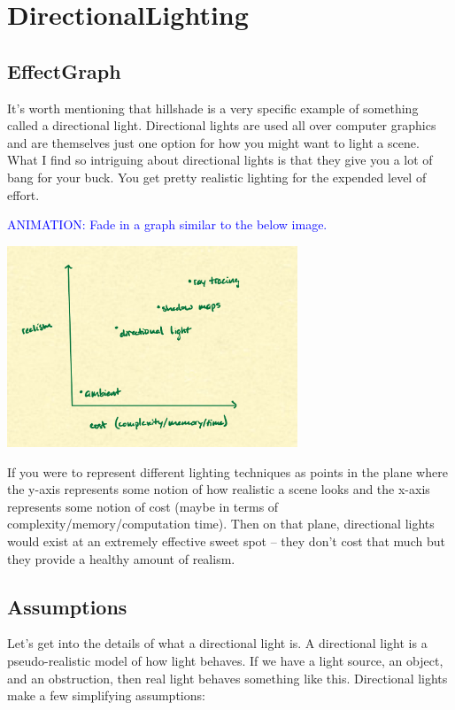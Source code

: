 \documentclass{article}
\newcommand\animation[1]{\textcolor{blue}{ANIMATION: #1}}
\begin{document}
\section{DirectionalLighting}

\subsection{EffectGraph}

It's worth mentioning that hillshade is a very specific example of something called a directional light.
Directional lights are used all over computer graphics and are themselves just one option for how you might want to light a scene.
What I find so intriguing about directional lights is that they give you a lot of bang for your buck.
You get pretty realistic lighting for the expended level of effort.

\animation{Fade in a graph similar to the below image.}

\begin{center}
	\includegraphics[width=0.65\textwidth,frame]{assets/realism.jpg}
\end{center}

If you were to represent different lighting techniques as points in the plane where the y-axis represents some notion of how realistic a scene looks and the x-axis represents some notion of cost (maybe in terms of complexity/memory/computation time).
Then on that plane, directional lights would exist at an extremely effective sweet spot -- they don't cost that much but they provide a healthy amount of realism.

\subsection{Assumptions}

Let's get into the details of what a directional light is.
A directional light is a pseudo-realistic model of how light behaves.
If we have a light source, an object, and an obstruction, then real light behaves something like this.
Directional lights make a few simplifying assumptions:
\end{document}
